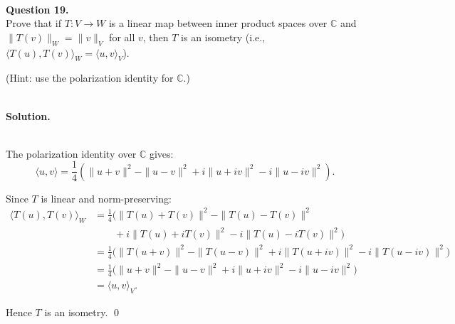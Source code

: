 \documentclass{article}
\newcommand{\CC}{\mathbb{C}}
\newcommand{\ip}[2]{\langle #1, #2 \rangle}
\begin{document}
\bigskip


\hfill \break  $~\!\!$ \dotfill \medskip \\
\textbf{Question 19.}\\
Prove that if $T: V \to W$ is a linear map between inner product spaces over $\CC$ and $\|T(v)\|_W = \|v\|_V$ for all $v$, then $T$ is an isometry (i.e., $\ip{T(u)}{T(v)}_W = \ip{u}{v}_V$).

(Hint: use the polarization identity for $\CC$.)

\noindent\\
\textbf{Solution.}\\
\quad\\
\begin{mdframed}[linewidth=1pt]
The polarization identity over $\CC$ gives:
\[
\ip{u}{v} = \frac{1}{4}\left(\|u+v\|^2 - \|u-v\|^2 + i\|u+iv\|^2 - i\|u-iv\|^2\right).
\]

Since $T$ is linear and norm-preserving:
\begin{align*}
\ip{T(u)}{T(v)}_W &= \frac{1}{4}\Big(\|T(u)+T(v)\|^2 - \|T(u)-T(v)\|^2 \\
&\qquad + i\|T(u)+iT(v)\|^2 - i\|T(u)-iT(v)\|^2\Big) \\
&= \frac{1}{4}\Big(\|T(u+v)\|^2 - \|T(u-v)\|^2 + i\|T(u+iv)\|^2 - i\|T(u-iv)\|^2\Big) \\
&= \frac{1}{4}\Big(\|u+v\|^2 - \|u-v\|^2 + i\|u+iv\|^2 - i\|u-iv\|^2\Big) \\
&= \ip{u}{v}_V.
\end{align*}

Hence $T$ is an isometry. \qed
\end{mdframed}
\end{document}
